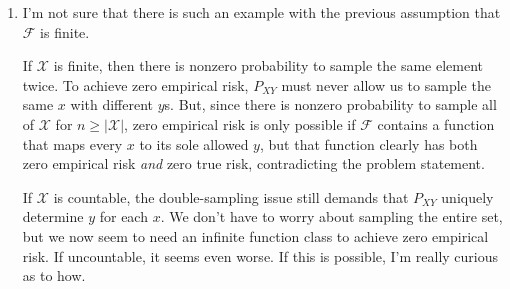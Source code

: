 \documentclass[11pt,letterpaper]{article}
\numberwithin{equation}{section}
\numberwithin{figure}{section}
\begin{document}
\begin{enumerate}
\begin{enumerate}
		\item I'm not sure that there is such an example with the previous assumption that $\mathcal{F}$ is finite.

		If $\mathcal{X}$ is finite, then there is nonzero probability to sample the same element twice. To achieve zero empirical risk, $P_{XY}$ must never allow us to sample the same $x$ with different $y$s. But, since there is nonzero probability to sample all of $\mathcal{X}$ for $n \geq |\mathcal{X}|$, zero empirical risk is only possible if $\mathcal{F}$ contains a function that maps every $x$ to its sole allowed $y$, but that function clearly has both zero empirical risk \emph{and} zero true risk, contradicting the problem statement.

		If $\mathcal{X}$ is countable, the double-sampling issue still demands that $P_{XY}$ uniquely determine $y$ for each $x$. We don't have to worry about sampling the entire set, but we now seem to need an infinite function class to achieve zero empirical risk. If uncountable, it seems even worse. If this is possible, I'm really curious as to how.










\end{enumerate}
\end{enumerate}
\end{document}
